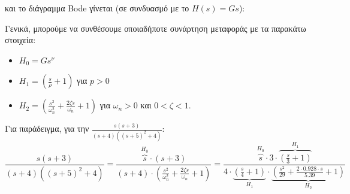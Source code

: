 \documentclass[11pt,a4paper,notitlepage,fleqn,final]{article}
\begin{document}
και το διάγραμμα Bode γίνεται (σε συνδυασμό με το \( H(s) = Gs \)):


Γενικά, μπορούμε να συνθέσουμε οποιαδήποτε συνάρτηση μεταφοράς με τα παρακάτω στοιχεία:
\begin{itemize}
	\item \( H_0 = Gs^ν \)
	\item \( \displaystyle H_1 = \left( \frac{s}{ρ}+1 \right) \) για \( p>0 \)
	\item \( \displaystyle H_2 = \left( \frac{s^2}{\omega_n^2} + \frac{2ζs}{\omega_n} + 1 \right) \) για \( \omega_n > 0 \) και \( 0<ζ<1 \).
\end{itemize}

Για παράδειγμα, για την \(\frac{s(s+3)}{(s+4)\left( (s+5)^2+4 \right)} \):
\[
\frac{s(s+3)}{(s+4)\left( (s+5)^2+4 \right)}
= \frac{  \overbrace{s}^{H_0}  \cdot  (s+3)
}{
	(s+4) \cdot \left(
	\frac{s^2}{\omega_n^2} + \frac{2\zeta s}{\omega_n} + 1
	\right)
}
= \frac{  \overbrace{s}^{H_0}  \cdot  3 \cdot \overbrace{\left(\frac{s}{3}+1\right)}^{H_1}
}{
	4 \cdot \underbrace{\left(\frac{s}{4}+1\right)}_{H_1} \cdot \underbrace{ \left(
		\frac{s^2}{29} + \frac{2\cdot 0.928\cdot  s}{5.39} + 1
		\right)
	}_{H_2}
}
\]
\end{document}
